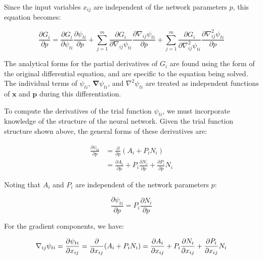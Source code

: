 \documentclass{article}
\begin{document}
\noindent Since the input variables $x_{ij}$ are independent of the network parameters $p$, this equation becomes:

\begin{equation}
  \frac {\partial G_i} {\partial p} = \frac {\partial G_i} {\partial \psi_{ti}} \frac {\partial \psi_{ti}} {\partial p} + \sum_{j=1}^m \frac {\partial G_i} {\partial \nabla_{ij} \psi_{ti}} \frac {\partial \nabla_{ij} \psi_{ti}} {\partial p} + \sum_{j=1}^m \frac {\partial G_i} {\partial \nabla_{ij}^2 \psi_{ti}} \frac {\partial \nabla_{ij}^2 \psi_{ti}} {\partial p}
\end{equation}

\noindent The analytical forms for the partial derivatives of $G_i$ are found using the form of the original differential equation, and are specific to the equation being solved. The individual terms of $\psi_{ti}$, $\mathbf \nabla \psi_{ti}$, and $\nabla^2 \psi_{ti}$ are treated as independent functions of $\mathbf x$ and $\mathbf p$  during this differentiation.

To compute the derivatives of the trial function $\psi_{ti}$, we must incorporate knowledge of the structure of the neural network. Given the trial function structure shown above, the general forms of these derivatives are:

\begin{align}
  \frac {\partial \psi_{ti}} {\partial p} &= \frac {\partial} {\partial p} \left( A_i + P_i N_i \right) \\
  &= \frac {\partial A_i} {\partial p} + P_i \frac {\partial N_i} {\partial p} + \frac {\partial P_i} {\partial p} N_i
\end{align}

\noindent Noting that $A_i$ and $P_i$ are independent of the network parameters $p$:

\begin{equation}
  \frac {\partial \psi_{ti}} {\partial p} = P_i \frac {\partial N_i} {\partial p}
\end{equation}

For the gradient components, we have:

\begin{equation}
  \nabla_{ij} \psi_{ti} = \frac {\partial \psi_{ti}} {\partial x_{ij}} \\
  = \frac {\partial} {\partial x_{ij}} (A_i + P_i N_i) \\
  = \frac {\partial A_i} {\partial x_{ij}} + P_i \frac {\partial N_i} {\partial x_{ij}} + \frac {\partial P_i} {\partial x_{ij}} N_i
\end{equation}
\end{document}
